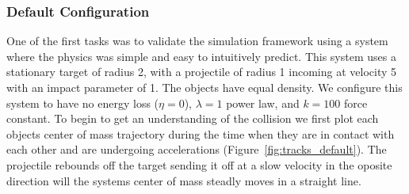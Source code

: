 \documentclass[aps,prl,floatfix,preprint,nofootinbib]{revtex4}
\begin{document}
\subsubsection{Default Configuration}
One of the first tasks was to validate the simulation framework using a system where the physics was simple and easy to intuitively predict. This system uses a stationary target of radius 2, with a projectile of radius 1 incoming at velocity 5 with an impact parameter of 1. The objects have equal density. We configure this system to have no energy loss ($\eta = 0$), $\lambda=1$ power law, and $k=100$ force constant. To begin to get an understanding of the collision we first plot each objects center of mass trajectory during the time when they are in contact with each other and are undergoing accelerations (Figure~\ref{fig:tracks_default}). The projectile rebounds off the target sending it off at a slow velocity in the oposite direction will the systems center of mass steadly moves in a straight line.
\end{document}

